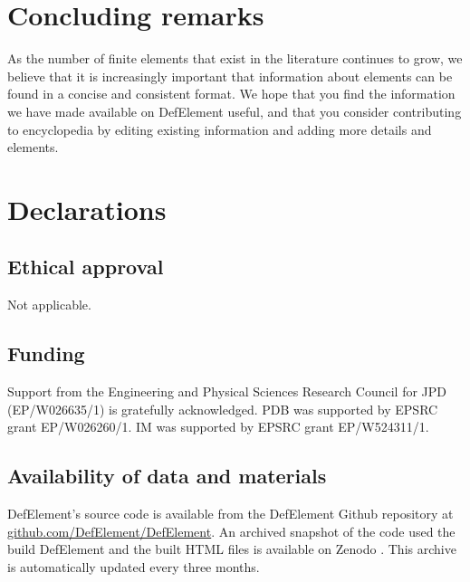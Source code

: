 \documentclass[sn-mathphys-num]{sn-jnl}%
\theoremstyle{thmstyleone}%
\theoremstyle{thmstyletwo}%
\theoremstyle{thmstylethree}%
\begin{document}
\section{Concluding remarks}\label{sec:conclusions}
As the number of finite elements that exist in the literature continues to grow, we believe
that it is increasingly important that information about elements can be found in a concise
and consistent format.
We hope that you find the information we have made available on DefElement useful, and
that you consider contributing to encyclopedia by editing existing information and adding
more details and elements.

\section*{Declarations}

\subsection*{Ethical approval}
Not applicable.

\subsection*{Funding}
Support from the Engineering and Physical Sciences Research Council for
JPD (EP/W026635/1) is gratefully acknowledged.
PDB was supported by EPSRC grant EP/W026260/1.
IM was supported by EPSRC grant EP/W524311/1.

\subsection*{Availability of data and materials}
DefElement's source code is available from the DefElement Github repository at \href{https://github.com/DefElement/DefElement}{github.com/DefElement/DefElement}.
An archived snapshot of the code used the build DefElement and the built HTML files is available on
Zenodo \cite{defelement-zenodo}. This archive is automatically updated every three months.



\end{document}
